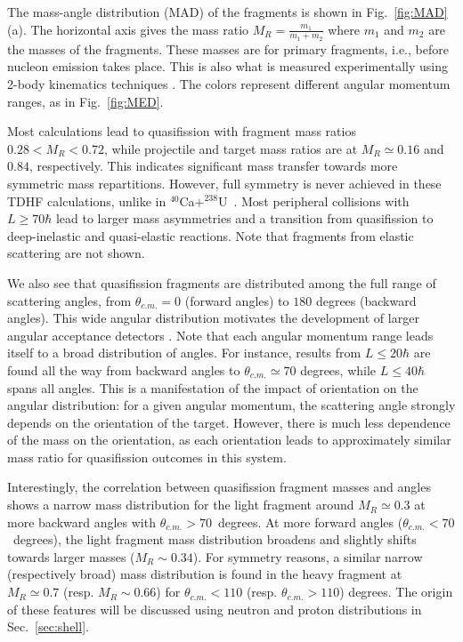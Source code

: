 The mass-angle distribution (MAD) of the fragments is shown in Fig.~\ref{fig:MAD}(a).
The horizontal axis gives the mass ratio $M_R=\frac{m_1}{m_1+m_2}$ where $m_1$ and $m_2$ are the masses of the fragments.
These masses are for primary fragments, i.e., before nucleon emission takes place.
This is also what is measured experimentally using 2-body kinematics techniques \citep{toke1985,hinde1996}.
The colors represent different angular momentum ranges, as in Fig.~\ref{fig:MED}.

Most calculations lead to quasifission with fragment mass ratios $0.28<M_R<0.72$, while projectile and target mass ratios are at $M_R\simeq0.16$ and $0.84$, respectively.
This indicates significant mass transfer towards more symmetric mass repartitions. However, full symmetry is never achieved in these TDHF calculations, unlike in $^{40}$Ca$+^{238}$U~\citep{wakhle2014}.
Most peripheral collisions with $L\ge70\hbar$ lead to larger mass asymmetries and a transition from quasifission to deep-inelastic and quasi-elastic reactions.
Note that fragments from elastic scattering are not shown.

We also see that quasifission fragments are distributed among the full range of scattering angles, from $\theta_{c.m.}=0$ (forward angles) to $180$ degrees (backward angles).
This wide angular distribution motivates the development of larger angular acceptance detectors \citep{khuyagbaatar2018,banerjee2019}.
Note that each angular momentum range leads itself to a broad distribution of angles.
For instance, results from $L\le20 \hbar$ are found all the way from backward angles to $\theta_{c.m.}\simeq70$ degrees, while $L\le40 \hbar$ spans all angles.
This is a manifestation of the impact of orientation on the angular distribution: for a given angular momentum, the scattering angle strongly depends on the orientation of the target.
However, there is much less dependence of the mass on the orientation, as each orientation leads to approximately similar mass ratio for quasifission outcomes in this system.

Interestingly, the correlation between quasifission fragment masses and angles shows a narrow mass distribution for the light fragment around $M_R\simeq0.3$ at more backward angles with $\theta_{c.m.}>70$~degrees.
At more forward angles ($\theta_{c.m.}<70$~degrees), the light fragment mass distribution  broadens and slightly shifts towards larger masses ($M_R\sim0.34$).
For symmetry reasons, a similar narrow (respectively broad) mass distribution is found in the heavy fragment at $M_R\simeq0.7$ (resp. $M_R\sim0.66$) for $\theta_{c.m.}<110$ (resp. $\theta_{c.m.}>110$) degrees.
The origin of these features will be discussed using neutron and proton distributions in Sec.~\ref{sec:shell}.

